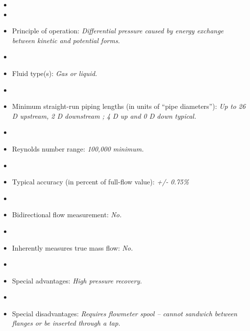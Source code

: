 \begin{itemize}
\goodbreak
\item{} 
\vskip 5pt
\item\item{} Principle of operation: {\it Differential pressure caused by energy exchange between kinetic and potential forms.}
\vskip 5pt
\item\item{} Fluid type(s): {\it Gas or liquid.}
\vskip 5pt
\item\item{} Minimum straight-run piping lengths (in units of ``pipe diameters''): {\it Up to 26 D upstream, 2 D downstream ; 4 D up and 0 D down typical.}
\vskip 5pt
\item\item{} Reynolds number range: {\it 100,000 minimum.}
\vskip 5pt
\item\item{} Typical accuracy (in percent of full-flow value): {\it +/- 0.75\%}
\vskip 5pt
\item\item{} Bidirectional flow measurement: {\it No.}
\vskip 5pt
\item\item{} Inherently measures true mass flow: {\it No.}
\vskip 5pt
\item\item{} Special advantages: {\it High pressure recovery.}
\vskip 5pt
\item\item{} Special disadvantages: {\it Requires flowmeter spool -- cannot sandwich between flanges or be inserted through a tap.}
\end{itemize}

